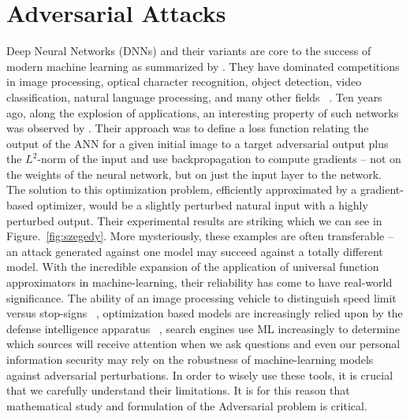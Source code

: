 \chapter{Adversarial Attacks}

\label{Chapter2} %

Deep Neural Networks (DNNs) and their variants are core to the success
of modern machine learning as summarized by \cite{prakash2018}. They
have dominated competitions in image processing, optical character
recognition, object detection, video classification, natural language
processing, and many other fields ~\cite{SCHMIDHUBER201585}. Ten years
ago, along the explosion of applications, an interesting property of
such networks was observed by \cite{szegedy2013}. Their approach was to define a loss function
relating the output of the ANN for a given initial image to a target adversarial 
output plus the $L^2$-norm of the input and use backpropagation to
compute gradients -- not on the weights of the neural network, but on
just the input layer to the network. The solution to this optimization
problem, efficiently approximated by a gradient-based optimizer, would
be a slightly perturbed natural input with a highly perturbed
output. Their experimental results are striking which we can see in
Figure.~\ref{fig:szegedy}.  More mysteriously, these examples
are often transferable -- an attack generated against one
model may succeed against a totally different model. With the
incredible expansion of the application of universal function
approximators in machine-learning, their reliability has come to have
real-world significance. The ability of an image processing vehicle to
distinguish speed limit versus stop-signs ~\cite{DBLP:journals/corr/EvtimovEFKLPRS17},
optimization based models are increasingly relied upon by the defense
intelligence apparatus ~\cite{hutchins2011intelligence}, search
engines use ML increasingly to
determine which sources will receive attention when we ask questions
and even our personal information security may rely on the robustness
of machine-learning models against adversarial perturbations. In order
to wisely use these tools, it is crucial that we carefully understand
their limitations. It is for this reason that mathematical study and
formulation of the Adversarial problem is critical. 


